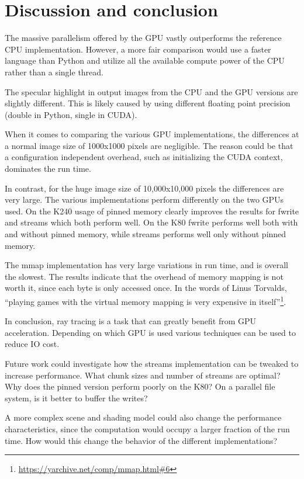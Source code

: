 \documentclass{article}
\begin{document}
\section{Discussion and conclusion}

The massive parallelism offered by the GPU vastly outperforms the reference CPU
implementation. However, a more fair comparison would use a faster language than
Python and utilize all the available compute power of the CPU rather than a
single thread.

The specular highlight in output images from the CPU and the GPU versions are
slightly different. This is likely caused by using different floating
point precision (double in Python, single in CUDA).

When it comes to comparing the various GPU implementations, the differences at a
normal image size of 1000x1000 pixels are negligible. The reason could be that a
configuration independent overhead, such as initializing the CUDA context,
dominates the run time.

In contrast, for the huge image size of 10,000x10,000 pixels the differences
are very large. The various implementations perform differently on the two GPUs
used. On the K240 usage of pinned memory clearly improves the results for
fwrite and streams which both perform well. On the K80 fwrite performs well both
with and without pinned memory, while streams performs well only without pinned
memory.

The mmap
implementation has very large variations in run time, and is overall the
slowest. The results indicate that the overhead of memory mapping is not worth
it, since each byte is only
accessed once.
In the words of Linus Torvalds, ``playing games with the virtual memory mapping
is very expensive in
itself''\footnote{\url{https://yarchive.net/comp/mmap.html\#6}}.

In conclusion, ray tracing is a task that can greatly benefit from GPU
acceleration. Depending on which GPU is used various techniques can be used to
reduce IO cost.

Future work could investigate how the streams implementation can be tweaked to
increase performance. What chunk sizes and number of streams are optimal? Why
does the pinned version perform poorly on the K80? On a parallel file system, is
it better to buffer the writes?

A more complex scene and shading model could also change the performance
characteristics, since the computation would occupy a larger fraction of the run time.
How would this change the behavior of the different implementations?
\end{document}
